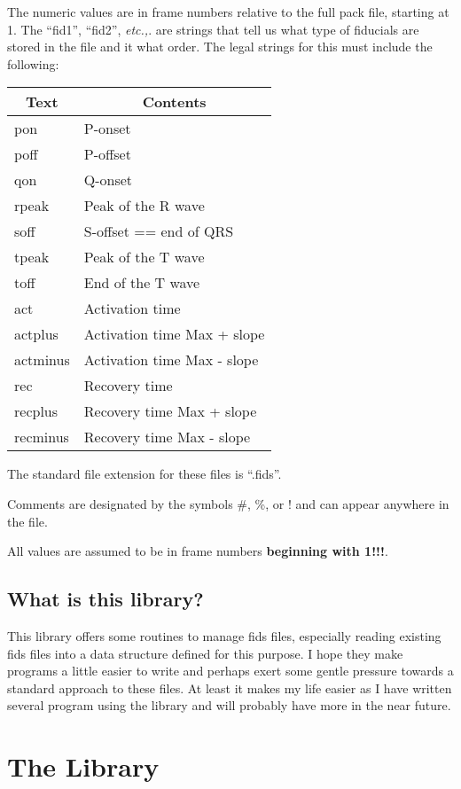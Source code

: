 \documentclass[11pt]{article}
\newcommand{\etc}{{\em etc.,}}
\begin{document}
The numeric values are in frame numbers relative to the full pack file,
starting at 1.  The ``fid1'', ``fid2'', \etc{}. are strings that tell us what
type of fiducials are stored in the file and it what order.  The legal
strings for this must include the following:

\begin{tabular}{|l|l|} \hline
\multicolumn{1}{|c|}{Text} &
\multicolumn{1}{|c|}{Contents} \\ \hline
pon	 & P-onset \\
poff	 & P-offset \\
qon	 & Q-onset \\
rpeak	 & Peak of the R wave \\
soff	 & S-offset == end of QRS \\
tpeak	 & Peak of the T wave \\
toff	 & End of the T wave \\
act	 & Activation time  \\
actplus	 & Activation time Max + slope \\
actminus & Activation time Max - slope \\
rec	 & Recovery time \\
recplus	 & Recovery time Max + slope \\
recminus & Recovery time Max - slope \\
\hline
\end{tabular}

The standard file extension for these files is ``.fids''.

Comments are designated by the symbols \#, \%, or ! and can appear anywhere
in the file.

All values are assumed to be in frame numbers {\bf beginning with 1!!!}.

\subsection{What is this library?}

This library offers some routines to manage fids files, especially reading
existing fids files into a data structure defined for this purpose.  I hope
they make programs a little easier to write and perhaps exert some gentle
pressure towards a standard approach to these files.  At least it makes my
life easier as I have written several program using the library and will
probably have more in the near future.

\section{The Library}
\end{document}
